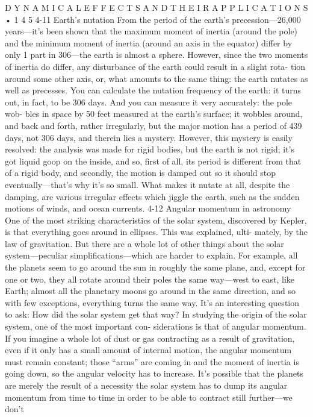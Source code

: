 \documentclass[10pt,oneside]{article}
\begin{document}
D Y N A M I C A L  E F F E C T S  A N D  T H E I R  A P P L I C A T I O N S • 1 4 5 4-11 Earth’s nutation From the period of the earth’s precession---26,000 years---it’s been shown that the maximum moment of inertia (around the pole) and the minimum moment of inertia (around an axis in the equator) differ by only 1 part in 306---the earth is almost a sphere. However, since the two moments of inertia do differ, any disturbance of the earth could result in a slight rota- tion around some other axis, or, what amounts to the same thing: the earth nutates as well as precesses. You can calculate the nutation frequency of the earth: it turns out, in fact, to be 306 days. And you can measure it very accurately: the pole wob- bles in space by 50 feet measured at the earth’s surface; it wobbles around, and back and forth, rather irregularly, but the major motion has a period of 439 days, not 306 days, and therein lies a mystery. However, this mystery is easily resolved: the analysis was made for rigid bodies, but the earth is not rigid; it’s got liquid goop on the inside, and so, first of all, its period is different from that of a rigid body, and secondly, the motion is damped out so it should stop eventually---that’s why it’s so small. What makes it nutate at all, despite the damping, are various irregular effects which jiggle the earth, such as the sudden motions of winds, and ocean currents. 4-12 Angular momentum in astronomy One of the most striking characteristics of the solar system, discovered by Kepler, is that everything goes around in ellipses. This was explained, ulti- mately, by the law of gravitation. But there are a whole lot of other things about the solar system---peculiar simplifications---which are harder to explain. For example, all the planets seem to go around the sun in roughly the same plane, and, except for one or two, they all rotate around their poles the same way---west to east, like Earth; almost all the planetary moons go around in the same direction, and so with few exceptions, everything turns the same way. It’s an interesting question to ask: How did the solar system get that way? In studying the origin of the solar system, one of the most important con- siderations is that of angular momentum. If you imagine a whole lot of dust or gas contracting as a result of gravitation, even if it only has a small amount of internal motion, the angular momentum must remain constant; those “arms” are coming in and the moment of inertia is going down, so the angular velocity has to increase. It’s possible that the planets are merely the result of a necessity the solar system has to dump its angular momentum from time to time in order to be able to contract still further---we don’t\par
\end{document}
